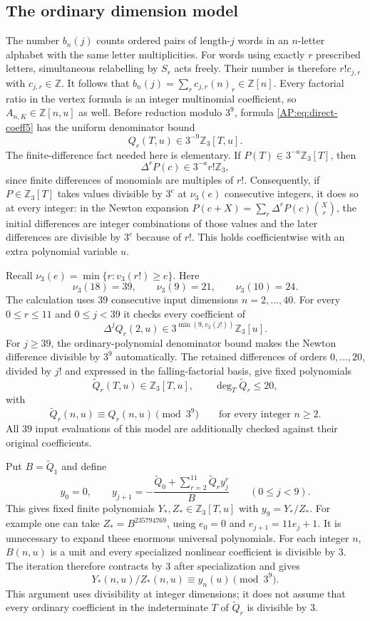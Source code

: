 \documentclass[11pt,a4paper]{article}
\theoremstyle{definition}\newtheorem{definition}[theorem]{Definition}
\theoremstyle{remark}\newtheorem{remark}[theorem]{Remark}
\numberwithin{equation}{section}
\begin{document}
\subsection{The ordinary dimension model}
The number $b_n(j)$ counts ordered pairs of length-$j$ words in an
$n$-letter alphabet with the same letter multiplicities.  For words
using exactly $r$ prescribed letters, simultaneous relabelling by
$S_r$ acts freely.  Their number is therefore $r!c_{j,r}$ with
$c_{j,r}\in\mathbb Z$.  It follows that
$b_n(j)=\sum_r c_{j,r}(n)_r\in\mathbb Z[n]$.
Every factorial ratio in the vertex formula is an integer
multinomial coefficient, so $A_{n,K}\in\mathbb Z[n,u]$ as well.  Before reduction modulo $3^9$, formula
\eqref{AP:eq:direct-coeff5} has the uniform denominator bound
\[
 Q_r(T,u)\in3^{-9}\mathbb Z_3[T,u].
\]
The finite-difference fact needed here is elementary.  If
$P(T)\in3^{-a}\mathbb Z_3[T]$, then
\[
 \Delta^rP(c)\in3^{-a}r!\mathbb Z_3,
\]
since finite differences of monomials are multiples of $r!$.
Consequently, if $P\in\mathbb Z_3[T]$ takes values divisible by $3^e$
at $\nu_3(e)$ consecutive integers, it does so at every integer:
in the Newton expansion
$P(c+X)=\sum_r\Delta^rP(c)\binom Xr$, the initial differences are
integer combinations of those values and the later differences
are divisible by $3^e$ because of $r!$.  This holds coefficientwise
with an extra polynomial variable $u$.

Recall $\nu_3(e)=\min\{r:v_3(r!)\geq e\}$.  Here
\[
 \nu_3(18)=39,\qquad\nu_3(9)=21,\qquad\nu_3(10)=24.
\]
The calculation uses $39$ consecutive input dimensions
$n=2,\ldots,40$.  For every $0\leq r\leq11$ and $0\leq j<39$ it
checks every coefficient of
\begin{equation}\label{AP:eq:newton-check5}
 \Delta^jQ_r(2,u)\in
 3^{\min(9,v_3(j!))}\mathbb Z_3[u].
\end{equation}
For $j\geq39$, the ordinary-polynomial denominator bound makes the
Newton difference divisible by $3^9$ automatically.  The retained
differences of orders $0,\ldots,20$, divided by $j!$ and expressed in
the falling-factorial basis, give fixed polynomials
\[
 \widetilde Q_r(T,u)\in\mathbb Z_3[T,u],\qquad
 \deg_T\widetilde Q_r\leq20,
\]
with
\[
 \widetilde Q_r(n,u)\equiv Q_r(n,u)\pmod{3^9}
                \qquad\text{for every integer }n\geq2.
\]
All $39$ input evaluations of this model are additionally checked
against their original coefficients.

Put $B=\widetilde Q_1$ and define
\[
 y_0=0,\qquad
 y_{j+1}=-\frac{\widetilde Q_0+
               \sum_{r=2}^{11}\widetilde Q_r y_j^r}{B}
                              \qquad(0\leq j<9).
\]
This gives fixed finite polynomials $Y_*,Z_*\in\mathbb Z_3[T,u]$
with $y_9=Y_*/Z_*$.  For example one can take
$Z_*=B^{235794769}$, using $e_0=0$ and $e_{j+1}=11e_j+1$.
It is unnecessary to expand these enormous universal polynomials.
For each integer $n$, $B(n,u)$ is a unit and every specialized
nonlinear coefficient is divisible by $3$.  The iteration therefore
contracts by $3$ after specialization and gives
\[
 Y_*(n,u)/Z_*(n,u)\equiv y_n(u)\pmod{3^9}.
\]
This argument uses divisibility at integer dimensions; it does not
assume that every ordinary coefficient in the indeterminate $T$ of
$\widetilde Q_r$ is divisible by $3$.
\end{document}
